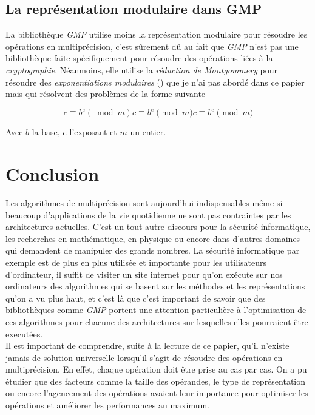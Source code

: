 \documentclass[letterpaper]{article}
\begin{document}
\subsection{La représentation modulaire dans GMP}

La bibliothèque \emph{GMP} utilise moins la représentation modulaire pour résoudre les
opérations en multiprécision, c'est sûrement dû au fait que \emph{GMP} n'est pas
une bibliothèque faite spécifiquement pour résoudre des opérations liées à la
\emph{cryptographie}. Néanmoins, elle utilise la \emph{réduction de Montgommery}
pour résoudre des \emph{exponentiations modulaires} (\cite{gmplibmodularpowering}) que
je n'ai pas abordé dans ce papier mais qui résolvent des problèmes de la forme
suivante

$$c ≡ b^e (\bmod m ) {\displaystyle c\equiv b^{e}{\pmod {m}}} c\equiv b^{e}{\pmod {m}}$$

Avec $b$ la base, $e$ l'exposant et $m$ un entier.

\footnotesize

\section{Conclusion}

Les algorithmes de multiprécision sont aujourd'hui indispensables même si
beaucoup d'applications de la vie quotidienne ne sont pas contraintes par les
architectures actuelles. C'est un tout autre discours pour la sécurité
informatique, les recherches en mathématique, en physique ou encore dans
d'autres domaines qui demandent de manipuler des grands nombres. La sécurité
informatique par exemple est de plus en plus utilisée et importante pour
les utilisateurs d'ordinateur, il suffit de visiter un site internet pour
qu'on exécute sur nos ordinateurs des algorithmes qui se basent sur les
méthodes et les représentations qu'on a vu plus haut, et c'est là que c'est
important de savoir que des bibliothèques comme \emph{GMP} portent une attention
particulière à l'optimisation de ces algorithmes pour chacune des architectures
sur lesquelles elles pourraient être executées.\\

Il est important de comprendre, suite à la lecture de ce papier, qu'il n'existe
jamais de solution universelle lorsqu'il s'agit de résoudre des opérations en
multiprécision. En effet, chaque opération doit être prise au cas par
cas. On a pu étudier que des facteurs comme la taille des opérandes, le type de
représentation ou encore l'agencement des opérations avaient leur importance
pour optimiser les opérations et améliorer les performances au maximum.\\
\end{document}
